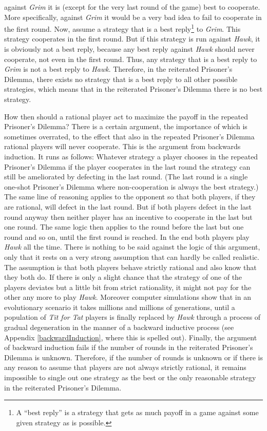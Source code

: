 against {\em Grim} it is (except for the very last round of the game) best to
cooperate. More specifically, against {\em Grim} it would be a very bad idea
to fail to cooperate in the first round. Now, assume a strategy that is a best
reply\footnote{A ``best reply'' is a strategy that gets as much payoff in a
  game against some given strategy as is possible.} to {\em Grim}. This
strategy cooperates in the first round.  But if this strategy is run against
{\em Hawk}, it is obviously not a best reply, because any best reply against
{\em Hawk} should never cooperate, not even in the first round. Thus, any
strategy that is a best reply to {\em Grim} is not a best reply to {\em Hawk}.
Therefore, in the reiterated Prisoner's Dilemma, there exists no strategy that
is a best reply to all other possible strategies, which means that in the
reiterated Prisoner's Dilemma there is no best strategy.

How then should a rational player act to maximize the payoff in the repeated
Prisoner's Dilemma? There is a certain argument, the importance of which is
sometimes overrated, to the effect that also in the repeated Prisoner's
Dilemma rational players will never cooperate.  This is the argument from
backwards induction. It runs as follows: Whatever strategy a player chooses in
the repeated Prisoner's Dilemma if the player cooperates in the last round
the strategy can still be ameliorated by defecting in the last round. (The
last round is a single one-shot Prisoner's Dilemma where non-cooperation is
always the best strategy.) The same line of reasoning applies to the opponent
so that both players, if they are rational, will defect in the last
round. But if both players defect in the last round anyway then neither player
has an incentive to cooperate in the last but one round. The same logic then
applies to the round before the last but one round and so on, until the first
round is reached. In the end both players play {\em Hawk} all the time. There
is nothing to be said against the logic of this argument, only that it rests
on a very strong assumption that can hardly be called realistic. The
assumption is that both players behave strictly rational and also know 
that they both do. If there is only a
slight chance that the strategy of one of the players deviates but a little
bit from strict rationality, it might not pay for the other any more to play
{\em Hawk}.  Moreover computer simulations show that in an evolutionary
scenario it takes millions and millions of generations, until a population of
{\em Tit for Tat} players is finally replaced by {\em Hawk} through a process
of gradual degeneration in the manner of a backward inductive process (see
Appendix \ref{backwardInduction}, where this is spelled out). Finally, the
argument of backward induction fails if the number of rounds in the reiterated
Prisoner's Dilemma is unknown. Therefore, if the number of rounds is unknown
or if there is any reason to assume that players are not always strictly
rational, it remains impossible to single out one strategy as the best or the
only reasonable strategy in the reiterated Prisoner's Dilemma.

